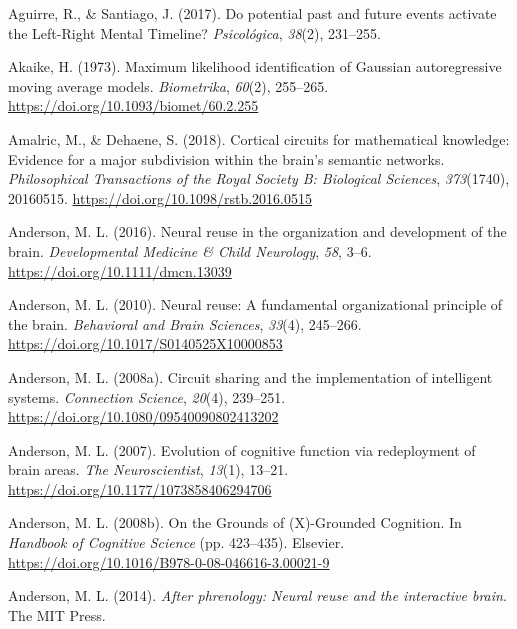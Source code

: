 \documentclass[
  a4paper,12pt,twoside,onecolumn,openright,final,oldfontcommands]{memoir}
\newlength{\cslhangindent}
\newlength{\cslentryspacingunit} %
\newenvironment{CSLReferences}[2] %
 {%
  \setlength{\parindent}{0pt}
  \ifodd #1
  \let\oldpar\par
  \def\par{\hangindent=\cslhangindent\oldpar}
  \fi
  \setlength{\parskip}{#2\cslentryspacingunit}
 }%
 {}
\begin{document}
\hypertarget{refs}{}
\begin{CSLReferences}{1}{0}
\leavevmode{}%
Aguirre, R., \& Santiago, J. (2017). Do potential past and future events activate the {Left}-{Right} {Mental} {Timeline}? \emph{Psicológica}, \emph{38}(2), 231--255.

\leavevmode{}%
Akaike, H. (1973). Maximum likelihood identification of {Gaussian} autoregressive moving average models. \emph{Biometrika}, \emph{60}(2), 255--265. \url{https://doi.org/10.1093/biomet/60.2.255}

\leavevmode{}%
Amalric, M., \& Dehaene, S. (2018). Cortical circuits for mathematical knowledge: Evidence for a major subdivision within the brain's semantic networks. \emph{Philosophical Transactions of the Royal Society B: Biological Sciences}, \emph{373}(1740), 20160515. \url{https://doi.org/10.1098/rstb.2016.0515}

\leavevmode{}%
Anderson, M. L. (2016). Neural reuse in the organization and development of the brain. \emph{Developmental Medicine \& Child Neurology}, \emph{58}, 3--6. \url{https://doi.org/10.1111/dmcn.13039}

\leavevmode{}%
Anderson, M. L. (2010). Neural reuse: {A} fundamental organizational principle of the brain. \emph{Behavioral and Brain Sciences}, \emph{33}(4), 245--266. \url{https://doi.org/10.1017/S0140525X10000853}

\leavevmode{}%
Anderson, M. L. (2008a). Circuit sharing and the implementation of intelligent systems. \emph{Connection Science}, \emph{20}(4), 239--251. \url{https://doi.org/10.1080/09540090802413202}

\leavevmode{}%
Anderson, M. L. (2007). Evolution of cognitive function via redeployment of brain areas. \emph{The Neuroscientist}, \emph{13}(1), 13--21. \url{https://doi.org/10.1177/1073858406294706}

\leavevmode{}%
Anderson, M. L. (2008b). On the {Grounds} of ({X})-{Grounded} {Cognition}. In \emph{Handbook of {Cognitive} {Science}} (pp. 423--435). Elsevier. \url{https://doi.org/10.1016/B978-0-08-046616-3.00021-9}

\leavevmode{}%
Anderson, M. L. (2014). \emph{After phrenology: Neural reuse and the interactive brain}. The MIT Press.


\end{CSLReferences}
\end{document}
